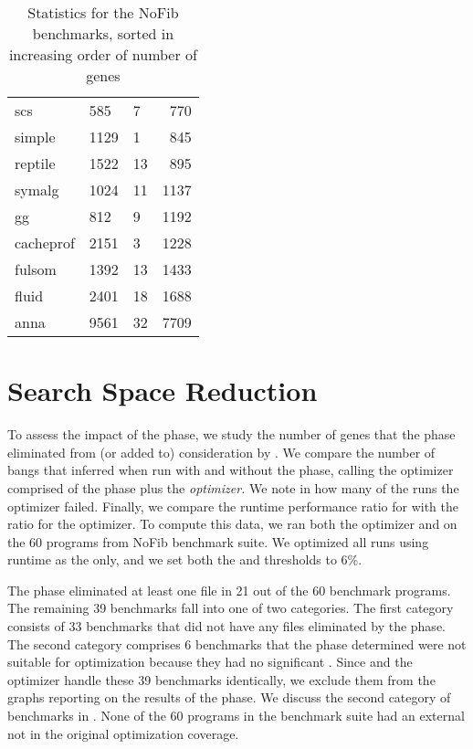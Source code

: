 \begin{table}[!htb]
\begin{minipage}{.5\linewidth}
\begin{tabular}{lllr}
            scs         &   585 &   7   &   770\\
            simple      &   1129&   1   &   845\\
            reptile     &   1522&   13  &   895\\
            symalg      &   1024&   11  &   1137\\
            gg          &   812 &   9   &   1192\\
            cacheprof   &   2151&   3   &   1228\\
            fulsom      &   1392&   13  &   1433\\
            fluid       &   2401&   18  &   1688\\
            anna        &   9561&   32  &   7709\\
        \end{tabular}
    \end{minipage} 
    \caption{Statistics for the NoFib benchmarks, sorted in increasing order of number of genes}
\label{tab:nofib-list}
\end{table}


\section{\Preopt{} Search Space Reduction}

To assess the impact of the \preopt{} phase, we study the number of
genes that the phase eliminated from (or added to) consideration by \Ao{}.
We compare the number of bangs that \Ao{} inferred when run with and
without the \preopt{} phase, calling the optimizer comprised of
the \preopt{} phase plus \Ao{} the \textit{\Preopt{} optimizer.} We
note in how many of the runs the \Preopt{} optimizer failed.  Finally,
we compare the runtime performance ratio for \Ao{} with the ratio for
the \Preopt{} optimizer.
To compute this data, we ran both the \Preopt{} optimizer and \Ao{} on
the 60 programs from NoFib benchmark suite.  We optimized all runs 
using runtime as the \profm{} only, and we set both 
the \hotspotcost{} and \absim{} thresholds to 6\%.

The \preopt{} phase eliminated at least one file in 21 out of the 60 
benchmark programs.
The remaining 39 benchmarks fall into one of two categories.
The first category consists of 33 benchmarks that did not have any files
eliminated by the \preopt{} phase. The second category comprises
6 benchmarks that the \preopt{} phase determined were not suitable for
optimization because they had no significant \hotspots{}.
Since \Ao{} and the \Preopt{} optimizer handle these 39 benchmarks
identically, we exclude them from the graphs reporting on the results
of the \preopt{} phase. We discuss the second category of benchmarks in
. None of the 60 programs in the benchmark suite
had an external \hotspot{} not in the original optimization coverage.

